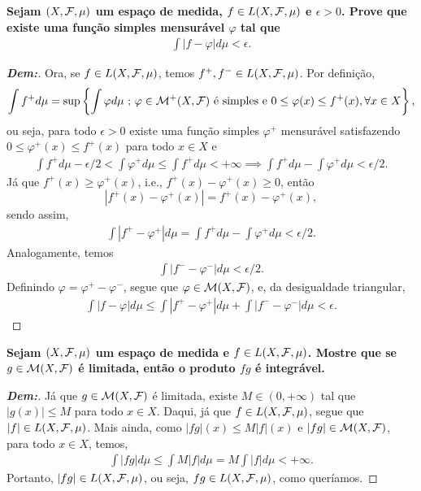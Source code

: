 \textbf{Sejam $(X, \mathcal F, \mu)$ um espaço de medida, $f \in L(X, \mathcal F, \mu)$ 
e $\epsilon > 0$. Prove que existe uma função simples mensurável $\varphi$
tal que 
\begin{align*}
  \int |f - \varphi| d\mu < \epsilon.
\end{align*}}
\begin{proof}[\textbf{Dem:}]
  Ora, se $f \in L(X, \mathcal F, \mu)$, temos $f^+, f^- \in L(X, \mathcal F, \mu)$. Por definição,
  \begin{align*}
    \int f^+ d\mu = \sup \left\{\int \varphi d\mu \text{ ; } \varphi \in \mathcal M^+ (X, \mathcal F)
    \text{ é simples 
    e } 0 \le \varphi(x) \le f^+(x), \forall x \in X\right\},
  \end{align*}
  ou seja, para todo $\epsilon>0$ existe uma função simples $\varphi^+$ mensurável satisfazendo 
  $0\le \varphi^+(x) \le f^+(x)$ para todo $x \in X$ e 
  \begin{align*}
    \int f^+ d\mu - \epsilon/2 < \int \varphi^+ d\mu \le \int f^+ d\mu<+\infty \implies 
    \int f^+ d\mu - \int \varphi^+ d\mu < \epsilon/2.
  \end{align*}
  Já que $f^+(x) \ge \varphi^+(x)$, i.e., 
  $f^+(x) - \varphi^+(x)\ge 0$, então 
    $$|f^+ (x) - \varphi^+ (x)| = f^+ (x) - \varphi^+(x),$$
  sendo assim, 
  \begin{align*}
    \int | f^+ - \varphi^+| d\mu  
    = \int f^+ d\mu - \int \varphi^+ d\mu < \epsilon/2.
  \end{align*}
  Analogamente, temos 
  \begin{align*}
    \int |f^- - \varphi^-| d\mu < \epsilon/2.
  \end{align*}
  Definindo $\varphi = \varphi^+ - \varphi^-$, segue que $\varphi \in 
  \mathcal M(X, \mathcal F)$, e, da desigualdade triangular,
  \begin{align*}
    \int |f - \varphi| d\mu \le \int |f^+ - \varphi^+| d\mu + \int |f^- - \varphi^-|d\mu 
    < \epsilon.
  \end{align*}
\end{proof}

\textbf{Sejam $(X, \mathcal F, \mu)$ um espaço de medida e $f \in L(X, \mathcal F, \mu)$. 
Mostre que se $g \in \mathcal M(X, \mathcal F)$ é limitada, então o produto 
$fg$ é integrável.}
\begin{proof}[\textbf{Dem:}]
  Já que $g \in \mathcal M(X, \mathcal F)$ é limitada, existe $M \in (0, +\infty)$ tal que 
  $|g(x)| \le M$ para todo $x \in X$. Daqui, já que $f \in L(X, \mathcal F, \mu)$, 
  segue que $|f| \in L(X, \mathcal F, \mu)$. Mais ainda, como $|fg|(x) \le M|f|(x)$ e 
  $|fg| \in \mathcal M (X, \mathcal F)$,
  para todo $x \in X$, temos,
  \begin{align*}
    \int |fg| d\mu \le \int M|f| d\mu = M \int |f| d\mu < +\infty. 
  \end{align*}
  Portanto, $|fg| \in L(X, \mathcal F, \mu)$, ou seja, $fg \in L(X, \mathcal F, \mu)$,
  como queríamos.
\end{proof}

